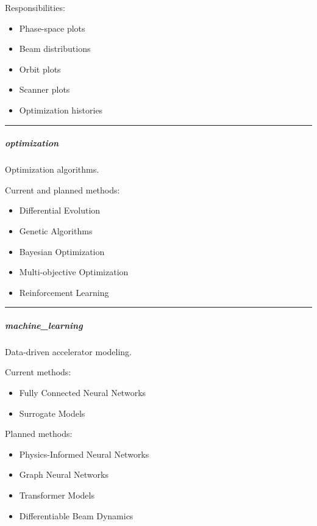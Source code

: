 \documentclass[
]{article}
\providecommand{\tightlist}{%
  \setlength{\itemsep}{0pt}\setlength{\parskip}{0pt}}
\begin{document}
Responsibilities:

\begin{itemize}
\tightlist
\item
  Phase-space plots
\item
  Beam distributions
\item
  Orbit plots
\item
  Scanner plots
\item
  Optimization histories
\end{itemize}

\begin{center}\rule{0.5\linewidth}{0.5pt}\end{center}

\hypertarget{optimization}{%
\subparagraph{optimization}\label{optimization}}

Optimization algorithms.

Current and planned methods:

\begin{itemize}
\tightlist
\item
  Differential Evolution
\item
  Genetic Algorithms
\item
  Bayesian Optimization
\item
  Multi-objective Optimization
\item
  Reinforcement Learning
\end{itemize}

\begin{center}\rule{0.5\linewidth}{0.5pt}\end{center}

\hypertarget{machine_learning}{%
\subparagraph{machine\_learning}\label{machine_learning}}

Data-driven accelerator modeling.

Current methods:

\begin{itemize}
\tightlist
\item
  Fully Connected Neural Networks
\item
  Surrogate Models
\end{itemize}

Planned methods:

\begin{itemize}
\tightlist
\item
  Physics-Informed Neural Networks
\item
  Graph Neural Networks
\item
  Transformer Models
\item
  Differentiable Beam Dynamics
\end{itemize}
\end{document}
